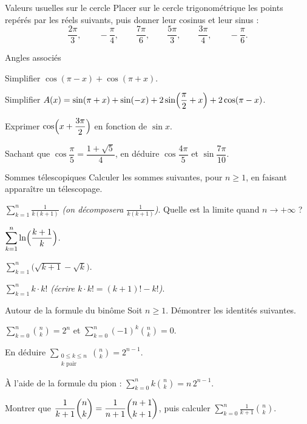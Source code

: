 \begin{exercice}[1]{Valeurs usuelles sur le cercle}
Placer sur le cercle trigonométrique les points repérés par les réels
suivants, puis donner leur cosinus et leur sinus :
\[
  \frac{2\pi}{3},\qquad -\frac{\pi}{4},\qquad \frac{7\pi}{6},\qquad
  \frac{5\pi}{3},\qquad \frac{3\pi}{4},\qquad -\frac{\pi}{6}.
\]
\end{exercice}

\begin{exercice}[1]{Angles associés}
\begin{questions}
  \item Simplifier $\cos(\pi-x)+\cos(\pi+x)$.
  \item Simplifier $A(x)=\sin(\pi+x)+\sin(-x)+2\sin\Bigl(\dfrac{\pi}{2}+x\Bigr)+2\cos(\pi-x)$.
  \item Exprimer $\cos\Bigl(x+\dfrac{3\pi}{2}\Bigr)$ en fonction de $\sin x$.
  \item Sachant que $\cos\dfrac{\pi}{5}=\dfrac{1+\sqrt5}{4}$, en déduire
    $\cos\dfrac{4\pi}{5}$ et $\sin\dfrac{7\pi}{10}$.
\end{questions}
\end{exercice}


\begin{exercice}[2]{Sommes télescopiques}
Calculer les sommes suivantes, pour $n\geq1$, en faisant apparaître un
télescopage.
\begin{questions}
  \item $\displaystyle\sum_{k=1}^{n}\frac{1}{k(k+1)}$
    \emph{(on décomposera $\frac{1}{k(k+1)}$)}. Quelle est la limite quand
    $n\to+\infty$ ?
  \item $\displaystyle\sum_{k=1}^{n}\ln\Bigl(\frac{k+1}{k}\Bigr)$.
  \item $\displaystyle\sum_{k=1}^{n}\bigl(\sqrt{k+1}-\sqrt{k}\bigr)$.
  \item $\displaystyle\sum_{k=1}^{n}k\cdot k!$\quad
    \emph{(écrire $k\cdot k!=(k+1)!-k!$)}.
\end{questions}
\end{exercice}

\begin{exercice}[2]{Autour de la formule du binôme}
Soit $n\geq1$. Démontrer les identités suivantes.
\begin{questions}
  \item $\displaystyle\sum_{k=0}^{n}\binom{n}{k}=2^{n}$ et
    $\displaystyle\sum_{k=0}^{n}(-1)^{k}\binom{n}{k}=0$.
  \item En déduire $\displaystyle\sum_{\substack{0\leq k\leq n\\ k\text{ pair}}}\binom{n}{k}=2^{n-1}$.
  \item À l'aide de la formule du pion :
    $\displaystyle\sum_{k=0}^{n}k\binom{n}{k}=n\,2^{n-1}$.
  \item Montrer que $\dfrac{1}{k+1}\dbinom{n}{k}=\dfrac{1}{n+1}\dbinom{n+1}{k+1}$, puis calculer
    $\displaystyle\sum_{k=0}^{n}\frac{1}{k+1}\binom{n}{k}$.
\end{questions}
\end{exercice}

